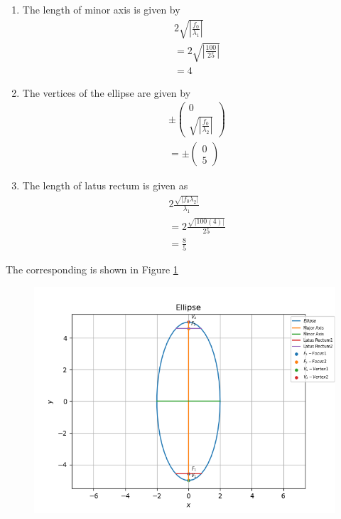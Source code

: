 \documentclass[12pt]{article}
\providecommand{\brak}[1]{\ensuremath{\left(#1\right)}}
\providecommand{\abs}[1]{\left\vert#1\right\vert}
\newcommand{\myvec}[1]{\ensuremath{\begin{pmatrix}#1\end{pmatrix}}}
\begin{document}
\begin{enumerate}
\item The length of minor axis is given by
\begin{align}
	& 2\sqrt{\abs{\frac{f_0}{\lambda_1}}}\\
	&= 2\sqrt{\abs{\frac{100}{25}}}\\
	&= 4
\end{align}
\item The vertices of the ellipse are given by
\begin{align}
	& \pm \myvec{0\\\sqrt{\abs{\frac{f_0}{\lambda_2}}}}\\
	&= \pm \myvec{0\\5}
\end{align}
\item The length of latus rectum is given as
\begin{align}
	& 2\frac{\sqrt{\abs{f_0 \lambda_2}}}{\lambda_1}\\
	&= 2\frac{\sqrt{\abs{100\brak{4}}}}{25}\\
	&= \frac{8}{5}
\end{align}
\end{enumerate}
The corresponding is shown in Figure \ref{fig:Fig1}
\begin{figure}[!h]
	\begin{center} 
	    \includegraphics[width=\columnwidth]{figs/ellipse}
	\end{center}
\caption{}
\label{fig:Fig1}
\end{figure}
\end{document}
